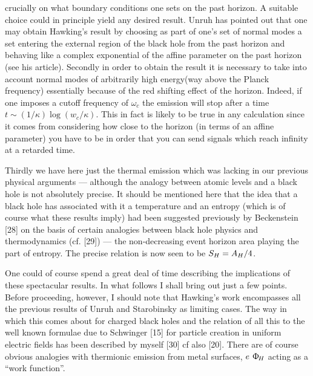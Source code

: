 crucially on what boundary conditions one sets on the past horizon. A suitable choice
could in principle yield any desired result. Unruh has pointed out that one may obtain
Hawking's result by choosing as part of one's set of normal modes a set entering the
external region of the black hole from the past horizon and behaving like a complex
exponential of the affine parameter on the past horizon (see his article).
Secondly in order to obtain the result it is necessary to take into account normal
modes of arbitrarily high energy(way above the Planck frequency) essentially because
of the red shifting effect of the horizon. Indeed, if one imposes a cutoff frequency
of $\omega_c$ the emission will stop after a time $t \sim (1/\kappa) \log(w_c/\kappa)$.
This in fact is likely to be true in any calculation since it comes from considering
how close to the horizon (in terms of an affine parameter) you have to be in
order that you can send signals which reach infinity at a retarded time.

Thirdly we have here just the thermal emission which was lacking in our previous physical
arguments --- although the analogy between atomic levels and a black hole is not
absolutely precise. It should be mentioned here that the idea that a black hole
has associated with it a temperature and an entropy (which is of course
what these results imply) had been suggested previously by Beckenstein [28]
on the basis of certain analogies between black hole physics and thermodynamics (cf. [29]) --- 
the non-decreasing event horizon area playing the part of entropy. The precise
relation is now seen to be $S_H = A_H/4$.

One could of course spend a great deal of time describing the implications
of these spectacular results. In what follows I shall bring out just a few points.
Before proceeding, however, I should note that Hawking's work encompasses
all the previous results of Unruh and Starobinsky as limiting cases. The way in which
this comes about for charged black holes and the relation of all this to the well
known formulae due to Schwinger [15] for particle creation in uniform electric
fields has been described by myself [30] cf also [20]. There are of course obvious
analogies with thermionic emission from metal surfaces, $e\mathop{}\Upphi_{\!H}$ acting as a
``work function''.

